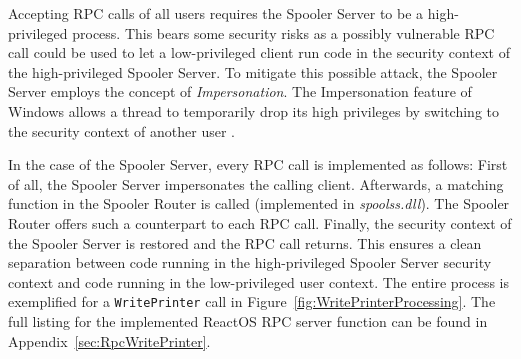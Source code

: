 Accepting \gls{RPC} calls of all users requires the Spooler Server to be a high-privileged process.
This bears some security risks as a possibly vulnerable \gls{RPC} call could be used to let a low-privileged client run code in the security context of the high-privileged Spooler Server.
To mitigate this possible attack, the Spooler Server employs the concept of \emph{Impersonation}.
The Impersonation feature of Windows allows a thread to temporarily drop its high privileges by switching to the security context of another user \cite{technet2015impersonation}.

In the case of the Spooler Server, every \gls{RPC} call is implemented as follows:
First of all, the Spooler Server impersonates the calling client.
Afterwards, a matching function in the Spooler Router is called (implemented in \emph{spoolss.dll}).
The Spooler Router offers such a counterpart to each \gls{RPC} call.
Finally, the security context of the Spooler Server is restored and the \gls{RPC} call returns.
This ensures a clean separation between code running in the high-privileged Spooler Server security context and code running in the low-privileged user context.
The entire process is exemplified for a \texttt{WritePrinter} call in Figure~\ref{fig:WritePrinterProcessing}.
The full listing for the implemented ReactOS \gls{RPC} server function can be found in Appendix~\ref{sec:RpcWritePrinter}.

